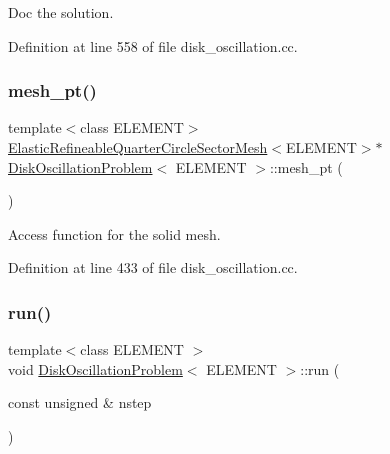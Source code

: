 Doc the solution. 



Definition at line 558 of file disk\+\_\+oscillation.\+cc.

\mbox{\label{classDiskOscillationProblem_a9de851f400e5c161c5abf8efb2f2b082}} 
\subsubsection{\texorpdfstring{mesh\+\_\+pt()}{mesh\_pt()}}
{\footnotesize\ttfamily template$<$class E\+L\+E\+M\+E\+NT$>$ \\
\hyperlink{classElasticRefineableQuarterCircleSectorMesh}{Elastic\+Refineable\+Quarter\+Circle\+Sector\+Mesh}$<$E\+L\+E\+M\+E\+NT$>$$\ast$ \hyperlink{classDiskOscillationProblem}{Disk\+Oscillation\+Problem}$<$ E\+L\+E\+M\+E\+NT $>$\+::mesh\+\_\+pt (\begin{DoxyParamCaption}{ }\end{DoxyParamCaption})\hspace{0.3cm}{\ttfamily [inline]}}



Access function for the solid mesh. 



Definition at line 433 of file disk\+\_\+oscillation.\+cc.

\mbox{\label{classDiskOscillationProblem_ac0f7b36ffffa73ee49bc95bd961835dd}} 
\subsubsection{\texorpdfstring{run()}{run()}}
{\footnotesize\ttfamily template$<$class E\+L\+E\+M\+E\+NT $>$ \\
void \hyperlink{classDiskOscillationProblem}{Disk\+Oscillation\+Problem}$<$ E\+L\+E\+M\+E\+NT $>$\+::run (\begin{DoxyParamCaption}\item[{const unsigned \&}]{nstep }\end{DoxyParamCaption})}



